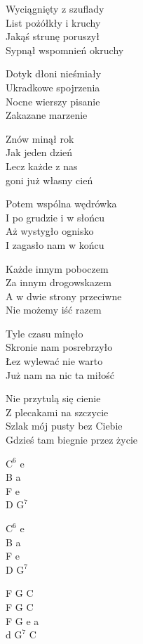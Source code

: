 \begin{text}
    Wyciągnięty z szuflady\\
    List pożółkły i kruchy\\
    Jakąś strunę poruszył\\
    Sypnął wspomnień okruchy

    Dotyk dłoni nieśmiały\\
    Ukradkowe spojrzenia\\
    Nocne wierszy pisanie\\
    Zakazane marzenie

    \vin Znów minął rok\\
    \vin Jak jeden dzień\\
    \vin Lecz każde z nas\\
    \vin goni już własny cień

    Potem wspólna wędrówka\\
    I po grudzie i w słońcu\\
    Aż wystygło ognisko\\
    I zagasło nam w końcu

    Każde innym poboczem\\
    Za innym drogowskazem\\
    A w dwie strony przeciwne\\
    Nie możemy iść razem

    Tyle czasu minęło\\
    Skronie nam posrebrzyło\\
    Łez wylewać nie warto\\
    Już nam na nic ta miłość

    Nie przytulą się cienie\\
    Z plecakami na szczycie\\
    Szlak mój pusty bez Ciebie\\
    Gdzieś tam biegnie przez życie
\end{text}
\begin{chord}
    $\mathrm{C^{6}}$ e\\
    B a\\
    F e\\
    D $\mathrm{G^{7}}$

    $\mathrm{C^{6}}$ e\\
    B a\\
    F e\\
    D $\mathrm{G^{7}}$

    F G C\\
    F G C\\
    F G e a\\
    d $\mathrm{G^{7}}$ C
\end{chord}
